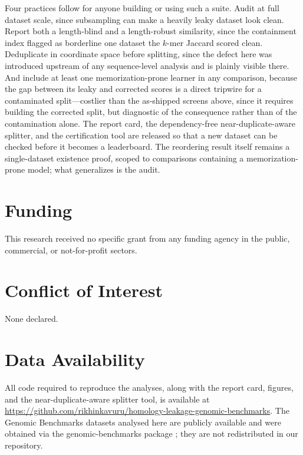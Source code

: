 \documentclass[webpdf,modern,large,namedate]{oup-authoring-template}%
\begin{document}
Four practices follow for anyone building or using such a suite. Audit at full dataset scale, since subsampling can make a heavily leaky dataset look clean. Report both a length-blind and a length-robust similarity, since the containment index flagged as borderline one dataset the $k$-mer Jaccard scored clean. Deduplicate in coordinate space before splitting, since the defect here was introduced upstream of any sequence-level analysis and is plainly visible there. And include at least one memorization-prone learner in any comparison, because the gap between its leaky and corrected scores is a direct tripwire for a contaminated split---costlier than the as-shipped screens above, since it requires building the corrected split, but diagnostic of the consequence rather than of the contamination alone. The report card, the dependency-free near-duplicate-aware splitter, and the certification tool are released so that a new dataset can be checked before it becomes a leaderboard. The reordering result itself remains a single-dataset existence proof, scoped to comparisons containing a memorization-prone model; what generalizes is the audit.

\section*{Funding}
This research received no specific grant from any funding agency in the public, commercial, or not-for-profit sectors.

\section*{Conflict of Interest}
None declared.

\section*{Data Availability}
All code required to reproduce the analyses, along with the report card, figures, and the near-duplicate-aware splitter tool, is available at \url{https://github.com/rikhinkavuru/homology-leakage-genomic-benchmarks}. The Genomic Benchmarks datasets analysed here are publicly available and were obtained via the genomic-benchmarks package \citep{gresova2023}; they are not redistributed in our repository.



\end{document}
